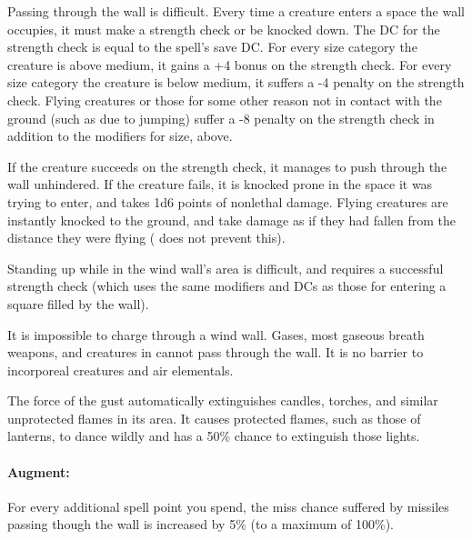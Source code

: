 Passing through the wall is difficult.
Every time a creature enters a space the wall occupies, it must make a strength check or be knocked down.
The DC for the strength check is equal to the spell's save DC. 
For every size category the creature is above medium, it gains a +4 bonus on the strength check.
For every size category the creature is below medium, it suffers a -4 penalty on the strength check.
Flying creatures or those for some other reason not in contact with the ground (such as due to jumping) 
suffer a -8 penalty on the strength check in addition to the modifiers for size, above.

If the creature succeeds on the strength check, it manages to push through the wall unhindered.
If the creature fails, it is knocked prone in the space it was trying to enter, and takes 1d6 points of nonlethal damage.
Flying creatures are instantly knocked to the ground, and take damage as if they had fallen from the distance they were
flying ( does not prevent this).

Standing up while in the wind wall's area is difficult, and requires a successful strength check (which uses the same modifiers
and DCs as those for entering a square filled by the wall).

It is impossible to charge through a wind wall.
Gases, most gaseous breath weapons, and creatures in  cannot pass through the wall.
It is no barrier to incorporeal creatures and air elementals.

The force of the gust automatically extinguishes candles, torches, and similar unprotected flames in its area. 
It causes protected flames, such as those of lanterns, to dance wildly and has a 50\% chance to extinguish those lights.

\paragraph{Augment:} For every additional spell point you spend, the miss chance suffered by missiles passing though the wall
is increased by 5\% (to a maximum of 100\%).
